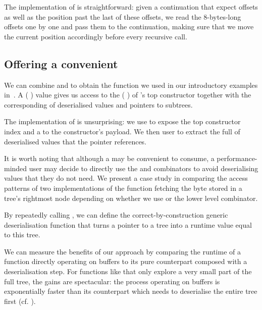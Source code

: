 
The implementation of  is straightforward: given
a continuation that expect  offsets as well as the
position past the last of these offsets, we read the 8-bytes-long
offsets one by one and pass them to the continuation, making sure
that we move the current position accordingly before every recursive call.

\subsection{Offering a convenient }\label{sec:dataview}

We can combine  and  to obtain
the  function we used in our introductory examples
in~.
%
A (  ) value gives us
access to the ( ) of
's top constructor together with the corresponding
 of deserialised values and pointers to subtrees.


The implementation of  is unsurprising: we use
 to expose the top constructor index and a
 to the constructor's payload.
%
We then user  to extract the full
 of deserialised values that the
pointer references.


It is worth noting that although a  may be
convenient to consume, a performance-minded user may decide to
directly use the  and 
combinators to avoid deserialising values that they do not need.
%
We present a case study in  comparing the
access patterns of two implementations of the function fetching the
byte stored in a tree's rightmost node depending on whether we use
 or the lower level  combinator.

By repeatedly calling , we can define the
correct-by-construction generic deserialisation function that
turns a pointer to a tree into a runtime value equal to this tree.


We can measure the benefits of our approach by comparing the runtime
of a function directly operating on buffers to its pure counterpart
composed with a deserialisation step.
%
For functions like  that only explore a
very small part of the full tree, the gains are spectacular: the
process operating on buffers is exponentially faster than its
counterpart which needs to deserialise the entire tree first
(cf. ).
